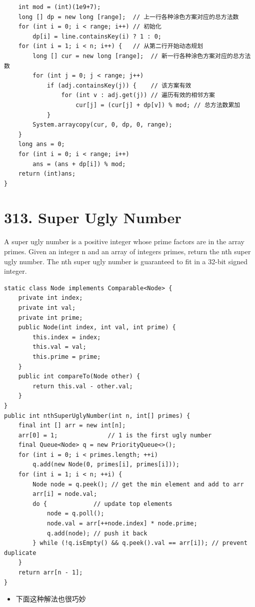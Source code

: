 \documentclass[9pt, b5paaper]{book}
\begin{document}
\begin{verbatim}
    int mod = (int)(1e9+7);
    long [] dp = new long [range];  // 上一行各种涂色方案对应的总方法数
    for (int i = 0; i < range; i++) // 初始化
        dp[i] = line.containsKey(i) ? 1 : 0;
    for (int i = 1; i < n; i++) {   // 从第二行开始动态规划
        long [] cur = new long [range];  // 新一行各种涂色方案对应的总方法数
        for (int j = 0; j < range; j++) 
            if (adj.containsKey(j)) {    // 该方案有效
                for (int v : adj.get(j)) // 遍历有效的相邻方案
                    cur[j] = (cur[j] + dp[v]) % mod; // 总方法数累加
            }
        System.arraycopy(cur, 0, dp, 0, range);
    }
    long ans = 0;
    for (int i = 0; i < range; i++) 
        ans = (ans + dp[i]) % mod;
    return (int)ans;
}
\end{verbatim}

\section{313. Super Ugly Number}
\label{sec-1-17}
A super ugly number is a positive integer whose prime factors are in the array primes.
Given an integer n and an array of integers primes, return the nth super ugly number.
The nth super ugly number is guaranteed to fit in a 32-bit signed integer.
\begin{verbatim}
static class Node implements Comparable<Node> {
    private int index;
    private int val;
    private int prime;
    public Node(int index, int val, int prime) {
        this.index = index;
        this.val = val;
        this.prime = prime;
    }
    public int compareTo(Node other) {
        return this.val - other.val;
    }
}
public int nthSuperUglyNumber(int n, int[] primes) {
    final int [] arr = new int[n];
    arr[0] = 1;              // 1 is the first ugly number
    final Queue<Node> q = new PriorityQueue<>();
    for (int i = 0; i < primes.length; ++i) 
        q.add(new Node(0, primes[i], primes[i]));
    for (int i = 1; i < n; ++i) {
        Node node = q.peek(); // get the min element and add to arr
        arr[i] = node.val;
        do {             // update top elements
            node = q.poll();
            node.val = arr[++node.index] * node.prime;
            q.add(node); // push it back
        } while (!q.isEmpty() && q.peek().val == arr[i]); // prevent duplicate
    }
    return arr[n - 1];
}
\end{verbatim}
\begin{itemize}
\item 下面这种解法也很巧妙
\end{itemize}
\end{document}
